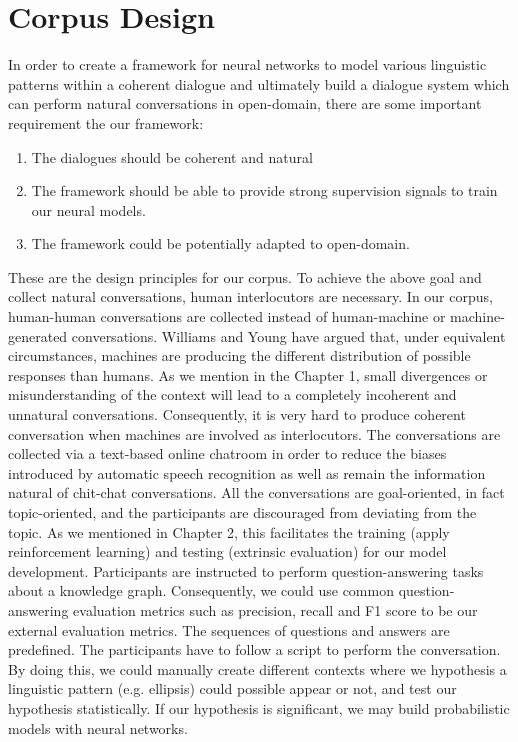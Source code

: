 \documentclass[bsc,frontabs,twoside,singlespacing,parskip,deptreport]{infthesis}     %
\begin{document}
\section{Corpus Design}

In order to create a framework for neural networks to model various linguistic patterns within a coherent dialogue and ultimately build a dialogue system which can perform natural conversations in open-domain, there are some important requirement the our framework:

\begin{enumerate}
   \item The dialogues should be coherent and natural
   
   \item The framework should be able to provide strong supervision signals to train our neural models. 
 
   \item The framework could be potentially adapted to open-domain.
\end{enumerate}

These are the design principles for our corpus. To achieve the above goal and collect natural conversations, human interlocutors are necessary. In our corpus, human-human conversations are collected instead of human-machine or machine-generated conversations. Williams and Young\cite{williams2007partially} have argued that, under equivalent circumstances, machines are producing the different distribution of possible responses than humans. As we mention in the Chapter 1, small divergences or misunderstanding of the context will lead to a completely incoherent and unnatural conversations. Consequently, it is very hard to produce coherent conversation when machines are involved as interlocutors. The conversations are collected via a text-based online chatroom in order to reduce the biases introduced by automatic speech recognition\cite{williams2007partially} as well as remain the information natural of chit-chat conversations. All the conversations are goal-oriented, in fact topic-oriented, and the participants are discouraged from deviating from the topic. As we mentioned in Chapter 2, this facilitates the training (apply reinforcement learning) and testing (extrinsic evaluation) for our model development. Participants are instructed to perform question-answering tasks about a knowledge graph. Consequently, we could use common question-answering evaluation metrics such as precision, recall and F1 score to be our external evaluation metrics. The sequences of questions and answers are predefined. The participants have to follow a script to perform the conversation. By doing this, we could manually create different contexts where we hypothesis a linguistic pattern (e.g. ellipsis) could possible appear or not, and test our hypothesis statistically. If our hypothesis is significant, we may build probabilistic models with neural networks.
\end{document}
